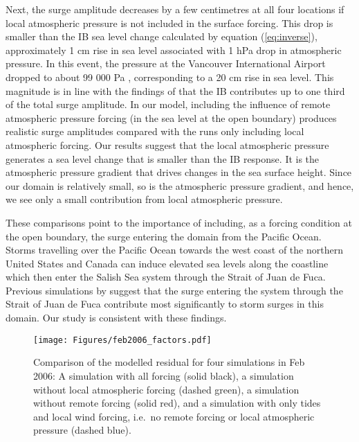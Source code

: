 \documentclass[letterpaper]{tATO2e}
\begin{document}
Next, the surge amplitude decreases by a few centimetres at all four locations if local atmospheric pressure is not included in the surface forcing. This drop is smaller than the IB sea level change calculated by equation (\ref{eq:inverse}), approximately 1 cm rise in sea level associated with 1 hPa drop in atmospheric pressure. In this event, the pressure at the Vancouver International Airport dropped to about 99 000 Pa \citep{ECClimateArchive}, corresponding to a 20 cm rise in sea level. This magnitude is in line with the findings of \citet{murty1995storm} that the IB contributes up to one third of the total surge amplitude. In our model, including the influence of remote atmospheric pressure forcing (in the sea level at the open boundary) produces realistic surge amplitudes compared with the runs only including local atmospheric forcing. Our results suggest that the local atmospheric pressure generates a sea level change that is smaller than the IB response. {\color{red} It is the atmospheric pressure gradient that drives changes in the sea surface height. Since our domain is relatively small, so is the atmospheric pressure gradient, and hence, we see only a small contribution from local atmospheric pressure. } 


These comparisons point to the importance of including, as a forcing condition at the open boundary, the surge entering the domain from the Pacific Ocean. Storms travelling over the Pacific Ocean towards the west coast of the northern United States and Canada can induce elevated sea levels along the coastline which then enter the Salish Sea system through the Strait of Juan de Fuca. Previous simulations by \citet{murty1995storm} suggest that the surge entering the system through the Strait of Juan de Fuca contribute most significantly to storm surges in this domain. {\color{red} Our study is consistent with these findings.}  

\begin{figure}
\centering
\texttt{[image: Figures/feb2006\_factors.pdf]}
\caption{Comparison of the modelled residual for four simulations in Feb 2006: A simulation with all forcing (solid black), a simulation without local atmospheric forcing (dashed green), a simulation without remote forcing (solid red), and a simulation with only tides and local wind forcing, i.e.\ no remote forcing or local atmospheric pressure (dashed blue). }
\label{fig:factors}
\end{figure}
\end{document}
